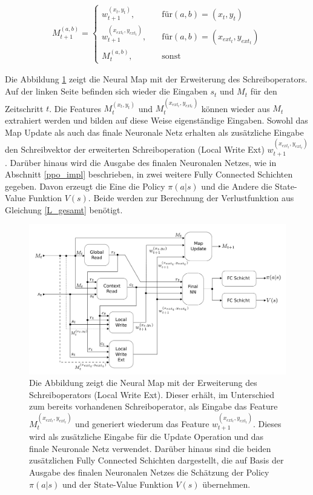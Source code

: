 \begin{equation}
 \begin{aligned}
 M_{t+1}^{(a,b)} =
 \begin{cases}
 w_{t+1}^{(x_t,y_t)}, & \quad \text{für} (a,b) = (x_t,y_t) \\
 w_{t+1}^{(x_{ext_t},y_{ext_t})}, & \quad \text{für} (a,b) = (x_{ext_t},y_{ext_t}) \\
 M_t^{(a,b)}, & \quad \text{sonst}
 \end{cases}
 \end{aligned}
\end{equation}

Die Abbildung \ref{fig_neural_map_extW} zeigt die Neural Map mit der Erweiterung des Schreiboperators. Auf der linken Seite befinden sich wieder die Eingaben $s_t$ und $M_t$ für den Zeitschritt $t$. Die Features $M_t^{(x_t,y_t)}$ und $M_t^{(x_{ext_t},y_{ext_t})}$ können wieder aus $M_t$ extrahiert werden und bilden auf diese Weise eigenständige Eingaben. Sowohl das Map Update als auch das finale Neuronale Netz erhalten als zusätzliche Eingabe den Schreibvektor der erweiterten Schreiboperation (Local Write Ext) $w_{t+1}^{(x_{ext_t},y_{ext_t})}$. Darüber hinaus wird die Ausgabe des finalen Neuronalen Netzes, wie in Abschnitt \ref{ppo_impl} beschrieben, in zwei weitere Fully Connected Schichten gegeben. Davon erzeugt die Eine die Policy $\pi(a|s)$ und die Andere die State-Value Funktion $V(s)$. Beide werden zur Berechnung der Verlustfunktion aus Gleichung \ref{L_gesamt} benötigt.


\begin{figure}[ht!]
  \centering
  \includegraphics[keepaspectratio,width=1.0\textwidth]{abbildungen/neural_map_extW.pdf}
  \caption{Die Abbildung zeigt die Neural Map mit der Erweiterung des Schreiboperators (Local Write Ext). Dieser erhält, im Unterschied zum bereits vorhandenen Schreiboperator, als Eingabe das Feature $M_t^{(x_{ext_t},y_{ext_t})}$ und generiert wiederum das Feature $w_{t+1}^{(x_{ext_t},y_{ext_t})}$. Dieses wird als zusätzliche Eingabe für die Update Operation und das finale Neuronale Netz verwendet. Darüber hinaus sind die beiden zusätzlichen Fully Connected Schichten dargestellt, die auf Basis der Ausgabe des finalen Neuronalen Netzes die Schätzung der Policy $\pi(a|s)$ und der State-Value Funktion $V(s)$ übernehmen.}
  \label{fig_neural_map_extW}
\end{figure}
